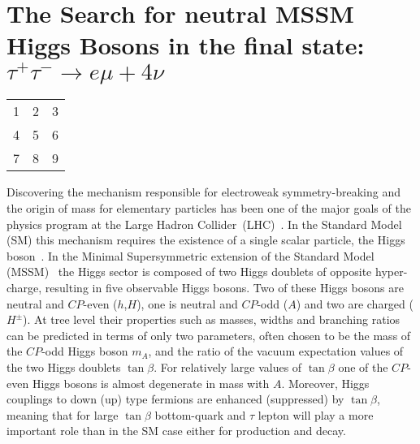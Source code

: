 \chapter[Neutral MSSM Higgs Search...]{The Search for neutral MSSM Higgs Bosons in the final state:
$\tau^{+}\tau^{-} \rightarrow e \mu + 4\nu$}


\begin{table}[htp]
\begin{tabular}{ l c r }
  1 & 2 & 3 \\
  4 & 5 & 6 \\
  7 & 8 & 9 \\
\end{tabular}
\end{table}

Discovering the mechanism responsible for electroweak
symmetry-breaking and the origin of mass for elementary particles has been
one of the major goals of the physics program at the Large Hadron
Collider~(LHC)~\cite{LHC}.  In the Standard Model (SM) this mechanism
requires the existence of a single scalar particle, the Higgs
boson~\cite{ENGLERT,HIGGS,HIGGS2,HIGGS3,Guralnik:1964eu}.
In the Minimal Supersymmetric extension of the Standard Model
(MSSM)~\cite{MSSM1, MSSM2} the Higgs sector is composed of two Higgs
doublets of opposite hyper-charge, resulting in five observable Higgs
bosons.  Two of these Higgs bosons are neutral and $CP$-even
($h$,$H$), one is neutral and $CP$-odd ($A$) and two are charged
($H^\pm$).  At tree level their properties such as masses, widths and
branching ratios can be predicted in terms of only two parameters,
often chosen to be the mass of the $CP$-odd Higgs boson $m_A$, and
the ratio of the vacuum expectation values of the two Higgs doublets
$\tan\beta$.  For relatively large values of $\tan\beta$ one of the
$CP$-even Higgs bosons is almost degenerate in mass with
$A$. Moreover, Higgs couplings to down (up) type fermions are enhanced
(suppressed) by $\tan\beta$, meaning that for large $\tan\beta$
bottom-quark and $\tau$ lepton will play a more important role than in
the SM case either for production and decay.

